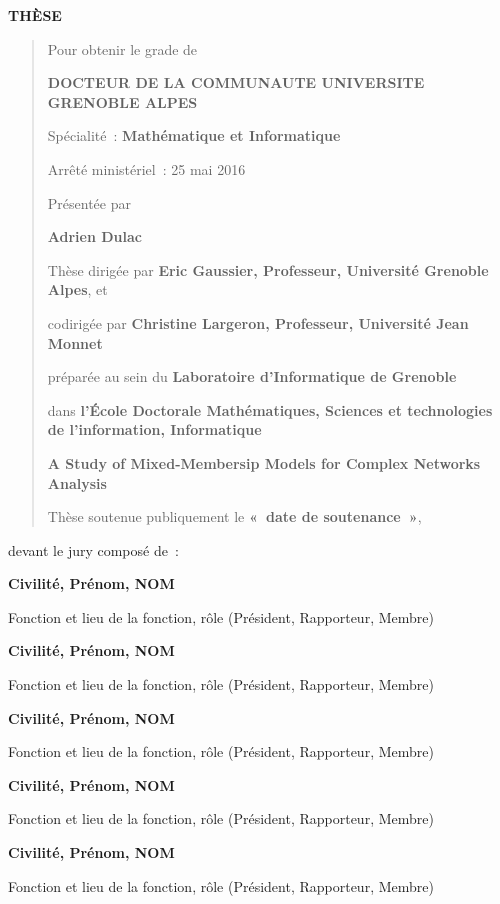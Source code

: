 \documentclass[]{article}
\date{}
\begin{document}
\textbf{THÈSE}

\begin{quote}
Pour obtenir le grade de

\textbf{DOCTEUR DE LA COMMUNAUTE UNIVERSITE GRENOBLE ALPES}

Spécialité~: \textbf{Mathématique et Informatique}

Arrêté ministériel~: 25 mai 2016

Présentée par

\textbf{Adrien Dulac}

Thèse dirigée par \textbf{Eric Gaussier, Professeur, Université Grenoble Alpes}, et

codirigée par \textbf{Christine Largeron, Professeur, Université Jean Monnet}

préparée au sein du \textbf{Laboratoire d'Informatique de Grenoble}

dans \textbf{l'École Doctorale Mathématiques, Sciences et technologies de l'information, Informatique}

\textbf{A Study of Mixed-Membersip Models for Complex Networks Analysis}

Thèse soutenue publiquement le \textbf{«~date de soutenance~»},
\end{quote}

devant le jury composé de~:

\textbf{Civilité, Prénom, NOM}

Fonction et lieu de la fonction, rôle (Président, Rapporteur, Membre)

\textbf{Civilité, Prénom, NOM}

Fonction et lieu de la fonction, rôle (Président, Rapporteur, Membre)

\textbf{Civilité, Prénom, NOM}

Fonction et lieu de la fonction, rôle (Président, Rapporteur, Membre)

\textbf{Civilité, Prénom, NOM}

Fonction et lieu de la fonction, rôle (Président, Rapporteur, Membre)

\textbf{Civilité, Prénom, NOM}

Fonction et lieu de la fonction, rôle (Président, Rapporteur, Membre)
\end{document}
